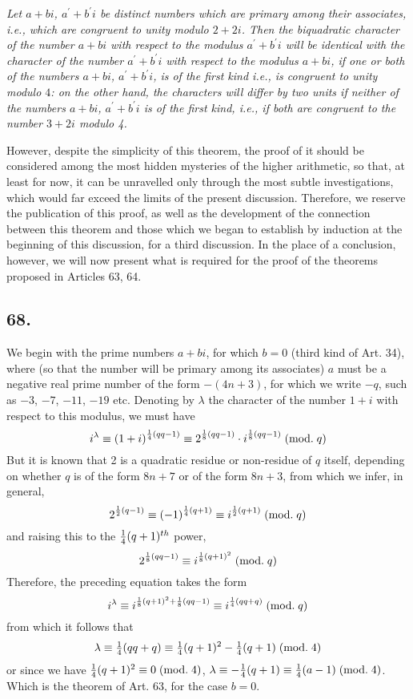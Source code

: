 \documentclass[twoside,12pt]{memoir}
\renewcommand{\pmod}[1]{\;(\textrm{mod.}\;#1)}
\let\oldfrac\frac
\def\frac#1#2{\mathchoice{\tfrac{#1}{#2}}{\oldfrac{#1}{#2}}{\genfrac{}{}{}{2}{#1}{#2\mathstrut}}{\genfrac{}{}{}{3}{#1}{#2\mathstrut}}}
\begin{document}
\textit{Let \(a+bi\), \(a^{\prime}+b^{\prime}i\) be distinct numbers which are primary among their associates, i{.}e{.}, which are congruent to unity modulo \(2+2i\).  Then the biquadratic character of the number \(a+bi\) with respect to the modulus \(a^{\prime}+b^{\prime}i\) will be identical with the character of the number \(a^{\prime}+b^{\prime}i\) with respect to the modulus \(a+bi\), if one or both of the numbers \(a+bi\), \(a^{\prime}+b^{\prime}i\), is of the first kind i{.}e{.}, is congruent to unity modulo \(4\): on the other hand, the characters will differ by two units if neither of the numbers \(a+bi\), \(a^{\prime}+b^{\prime}i\) is of the first kind, i{.}e{.}, if both are congruent to the number \(3+2i\) modulo 4.}

However, despite the simplicity of this theorem, the proof of it should be considered among the most hidden mysteries of the higher arithmetic, so that, at least for now, it can be unravelled only through the most subtle investigations, which would far exceed the limits of the present discussion. Therefore, we reserve the publication of this proof, as well as the development of the connection between this theorem and those which we began to establish by induction at the beginning of this discussion, for a third discussion. In the place of a conclusion, however, we will now present what is required for the proof of the theorems proposed in Articles 63, 64.
%

\subsection*{68.}

We begin with the prime numbers \(a+b i\), for which \(b=0\) (third kind of Art. 34), where (so that the number will be primary among its associates) \(a\) must be a negative real prime number of the form \(-(4n+3)\), for which we write \(-q\), such as \(-3\), \(-7\), \(-11\), \(-19\) etc{.} Denoting by \(\lambda\) the character of the number \(1+i\) with respect to this modulus, we must have
\[i^{\lambda} \equiv (1+i)^{\frac{1}{4}(qq-1)} \equiv 2^{\frac{1}{8}(qq-1)} \cdot i^{\frac{1}{8}(qq-1)}\pmod{q}\]
But it is known that 2 is a quadratic residue or non-residue of \(q\) itself, depending on whether \(q\) is of the form \(8n+7\) or of the form \(8n+3\), from which we infer, in general,
\[2^{\frac{1}{2}(q-1)} \equiv (-1)^{\frac{1}{4}(q+1)} \equiv i^{\frac{1}{2}(q+1)}\pmod{q}\]
and raising this to the \(\frac{1}{4}(q+1)^{th}\) power,
\[2^{\frac{1}{8}(qq-1)} \equiv i^{\frac{1}{8}(q+1)^{2}}\pmod{q}\]
Therefore, the preceding equation takes the form
\[i^{\lambda} \equiv i^{\frac{1}{8}(q+1)^{2}+\frac{1}{8}(qq-1)} \equiv i^{\frac{1}{4}(qq+q)}\pmod{q}\]
from which it follows that
\[\lambda \equiv \frac{1}{4}(qq+q) \equiv \frac{1}{4}(q+1)^{2}-\frac{1}{4}(q+1)\pmod{4}\]
or since we have \(\frac{1}{4}(q+1)^{2} \equiv 0\pmod{4}\), \(\lambda \equiv -\frac{1}{4}(q+1) \equiv \frac{1}{4}(a-1)\pmod{4}\).
Which is the theorem of Art. 63, for the case \(b=0\).
%
\end{document}
